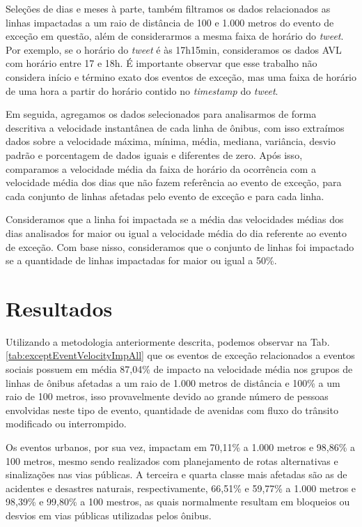 \documentclass[
	12pt,				%
	oneside,			%
	a4paper,			%
	english,			%
	brazil				%
	]{abntex2ppgsi}
\begin{document}
Seleções de dias e meses à parte, também filtramos os dados relacionados as linhas impactadas a um raio de distância de 100 e 1.000 metros do evento de exceção em questão, além de considerarmos a mesma faixa de horário do \textit{tweet}. Por exemplo, se o horário do \textit{tweet} é às 17h15min, consideramos os dados AVL com horário entre 17 e 18h. É importante observar que esse trabalho não considera início e término exato dos eventos de exceção, mas uma faixa de horário de uma hora a partir do horário contido no \textit{timestamp}  do \textit{tweet}.

Em seguida, agregamos os dados selecionados para analisarmos  de forma descritiva a velocidade instantânea de cada linha de ônibus, com isso extraímos dados sobre a velocidade máxima, mínima, média, mediana, variância, desvio padrão e porcentagem de dados iguais e diferentes de zero. Após isso, comparamos a velocidade média da faixa de horário da ocorrência com a velocidade média dos dias que não fazem referência ao evento de exceção, para cada conjunto de linhas afetadas pelo evento de exceção e para cada linha.

Consideramos que a linha foi impactada se a média das velocidades médias dos dias analisados for maior ou igual a velocidade média do dia referente ao evento de exceção. Com base nisso, consideramos que o conjunto de linhas foi impactado se a quantidade de linhas impactadas for maior ou igual a 50\%. 

\section*{Resultados}

Utilizando a metodologia anteriormente descrita, podemos observar na Tab. \ref{tab:exceptEventVelocityImpAll} que os eventos de exceção relacionados a eventos sociais possuem em média 87,04\% de impacto na velocidade média nos grupos de linhas de ônibus afetadas a um raio de 1.000 metros de distância e 100\% a um raio de 100 metros, isso provavelmente devido ao grande número de pessoas envolvidas neste tipo de evento, quantidade de avenidas com fluxo do trânsito modificado ou interrompido. 

Os eventos urbanos, por sua vez, impactam em 70,11\% a 1.000 metros e 98,86\% a 100 metros, mesmo sendo realizados com planejamento de rotas alternativas e sinalizações nas vias públicas. A terceira e quarta classe mais afetadas são as de acidentes e desastres naturais, respectivamente, 66,51\% e 59,77\% a 1.000 metros e 98,39\% e 99,80\% a 100 mestros, as quais normalmente resultam em bloqueios ou desvios em vias públicas utilizadas pelos ônibus. 
\end{document}
